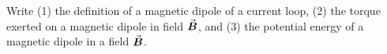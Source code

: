 

\vspace*{\fill}
\centering

Write (1) the definition of a magnetic dipole of a current loop, (2) the torque exerted on a magnetic dipole in field $\va*{B}$, and (3) the potential energy of a magnetic dipole in a field $\va*{B}$.

\centering
\vspace*{\fill}

